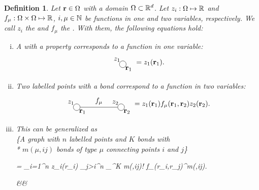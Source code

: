 \documentclass[8.5pt,twoside,twocolumn]{article}
\renewcommand\r{\bo r}
\theoremstyle{standard}
\newtheorem{defi}[theo]{Definition}
\newcommand{\itemEq}[1]{%
        \begingroup%
        \setlength{\abovedisplayskip}{0pt}%
        \setlength{\belowdisplayskip}{0pt}%
        \parbox[c]{\linewidth}{\begin{flalign}#1&&\end{flalign}}%
        \endgroup}
\begin{document}
\begin{defi}
\label{graphdefi_1}
Let $\r \in \Om$ with a domain $\Omega \subset \mathbb{R}^d$. Let ${z_i : \Omega \mapsto \mathbb{R}}$ and ${f_\mu : \Omega \times \Omega \mapsto \mathbb{R}}$, $i, \mu \in \mathbb{N}$ be functions
in one and two variables, respectively. We call $z_i$ the  and $f_\mu$ the . With them, the following equations hold:
\begin{enumerate}[i.]
  \item A  with a property corresponds to a function in one variable:
   \begin{equation}
  \begin{tikzpicture}[baseline={(current bounding box.center)}]%
  	\draw (1,0) node[circle,minimum size=0.2cm,draw] (A) {};
	\node [above left] at (A) {$z_1$};
  	\node [below right] at (A) {$\r_1$};
	\end{tikzpicture}
= z_1(\r_1).
\end{equation}
  \item Two labelled points with a bond correspond to a function in two variables:
  \begin{equation}
  \begin{tikzpicture}[baseline={(current bounding box.center)}]%
  \draw (1.0,0) node[circle,minimum size=0.2cm,draw,baseline=center] (A) {};
  \draw (3.2,0) node[circle,minimum size=0.2cm,draw] (B) {};

  \node [above left] at (A) {$z_1$};
  \node [below right] at (A) {$\r_1$};

  \node [above left] at (B) {$z_2$};
  \node [below right] at (B) {$\r_2$};


  \draw (A.east) -- node[above]{$f_\mu$} (B.west);
\end{tikzpicture}
= z_1(\r_1) f_\mu(\r_1,\r_2) z_2(\r_2).
\end{equation}
  \item This can be generalized as \\
  \{A graph with $n$ labelled points and $K$ bonds with\\*
  \vphantom{}\hskip5pt  $m(\mu,ij)$ bonds of type $\mu$ connecting points $i$ and $j$\}\\
    \itemEq{\begin{aligned}
  \qquad= \prod_{i=1}^n z_i(\r_i) \prod_{j>i}^n \prod_{\mu=1}^K\frac 1 {m(\mu,ij)!} f_\mu(\r_i,\r_j)^{m(\mu,ij)}.
  \label{fulldefi1}
  \end{aligned}}
\end{enumerate}
\end{defi}
\end{document}
